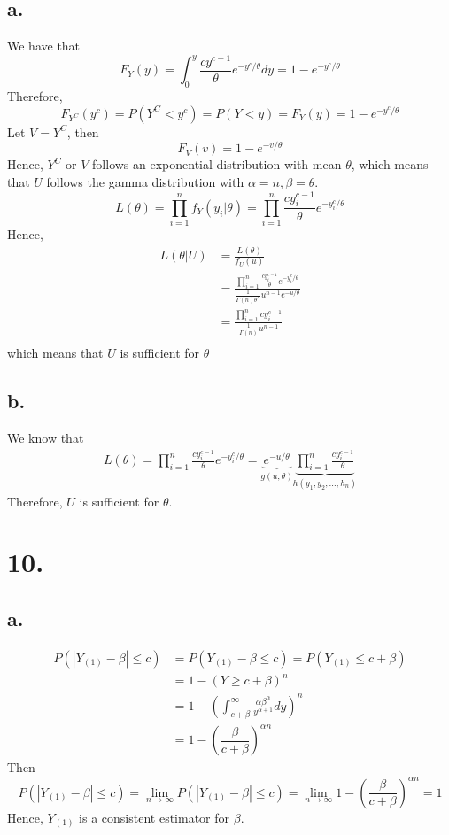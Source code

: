 \documentclass[11pt]{article}
\begin{document}
\subsection*{a.}
We have that
\[
    F_Y(y) = \int_0^y \frac{cy^{c-1}}{\theta} e^{-y^c/\theta} dy = 1-e^{-y^c/\theta}
\]
Therefore,
\[
    F_{Y^C}(y^c) =  P(Y^C < y^c) =  P(Y<y) = F_Y(y) = 1 - e^{-y^c / \theta}
\]
Let $V = Y^C$, then
\[
    F_V(v) = 1 - e^{-v / \theta}
\]
Hence, $Y^C$ or $V$ follows an exponential distribution with mean $\theta$, which means that $U$ follows
the gamma distribution with $\alpha = n, \beta = \theta$.
\[
    L(\theta) = \prod_{i=1}^n f_Y(y_i|\theta) = \prod_{i=1}^n \frac{cy_i^{c-1}}{\theta}e^{-y_i^c/\theta}       
\]
Hence, 
\begin{equation*}
    \begin{aligned}
        L(\theta|U) &= \frac{L(\theta)}{f_U(u)} \\
        &= \frac{\prod_{i=1}^n \frac{cy_i^{c-1}}{\theta}e^{-y_i^c/\theta}}{\frac{1}{\Gamma(n)\theta^n} u^{n-1} e^{-u/\theta}} \\
        &= \frac{\prod_{i=1}^n cy_i^{c-1}}{\frac{1}{\Gamma(n)} u^{n-1}} \\
    \end{aligned}
\end{equation*}
which means that $U$ is sufficient for $\theta$
\subsection*{b.}
We know that 
\begin{equation*}
    \begin{aligned}
        L(\theta) = \prod_{i=1}^n \frac{cy_i^{c-1}}{\theta}e^{-y_i^c/\theta} = \underbrace{e^{-u/\theta}}_{g(u,\theta)} \underbrace{\prod_{i=1}^n \frac{cy_i^{c-1}}{\theta}}_{h(y_1,y_2, \ldots, h_n)}
    \end{aligned}
\end{equation*}
Therefore, $U$ is sufficient for $\theta$.
\pagebreak
\section*{10.}
\subsection*{a.}
\begin{equation*}
    \begin{aligned}
        P(|Y_{(1)} - \beta| \le c) &= P(Y_{(1)} - \beta \le c) = P(Y_{(1)} \le c + \beta) \\
        &= 1 - (Y \ge c+\beta)^n \\
        &= 1 - \left(\int_{c+\beta}^\infty \frac{\alpha \beta^\alpha}{y^{\alpha+1}} dy \right)^n \\
        &= 1 - \left(\dfrac{{\beta}}{c+{\beta}} \right)^{\alpha n}
    \end{aligned}
\end{equation*}
Then 
\[
    P(|Y_{(1)} - \beta | \le c) = \lim_{n \to \infty} P(|Y_{(1)} - \beta | \le c) = \lim_{n \to \infty} 1 - \left(\dfrac{{\beta}}{c+{\beta}} \right)^{\alpha n} = 1  
\]
Hence, $Y_{(1)}$ is a consistent estimator for $\beta$.
\end{document}
